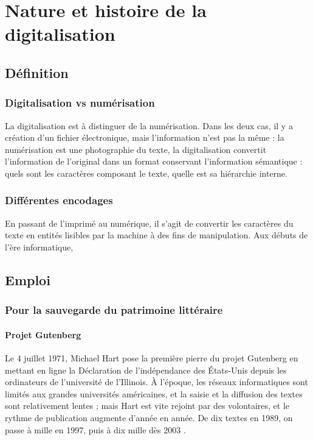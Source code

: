 \chapter{Nature et histoire de la digitalisation}\label{HistDigit}
\section{Définition}\label{HistDigitDef}
\subsection{Digitalisation vs numérisation}
La digitalisation est à distinguer de la numérisation.
Dans les deux cas, il y a création d'un fichier électronique, mais l'information n'est pas la même : la numérisation est une photographie du texte, la digitalisation convertit l'information de l'original dans un format conservant l'information sémantique : quels sont les caractères composant le texte, quelle est sa hiérarchie interne.
\subsection{Différentes encodages}
En passant de l'imprimé au numérique, il s'agit de convertir les caractères du texte en entités lisibles par la machine à des fins de manipulation.
Aux débuts de l'ère informatique, 
\section{Emploi}\label{HistDigitEmp}
\subsection{Pour la sauvegarde du patrimoine littéraire}
\subsubsection{Projet Gutenberg}
Le 4 juillet 1971, Michael Hart pose la première pierre du projet Gutenberg en mettant en ligne la Déclaration de l'indépendance des États-Unis depuis les ordinateurs de l'université de l'Illinois.
À l'époque, les réseaux informatiques sont limités aux grandes universités américaines, et la saisie et la diffusion des textes sont relativement lentes ; mais Hart est vite rejoint par des volontaires, et le rythme de publication augmente d'année en année.
De dix textes en 1989, on passe à mille en 1997, puis à dix mille dès 2003 \parencite{lebert_projet_2010}.

